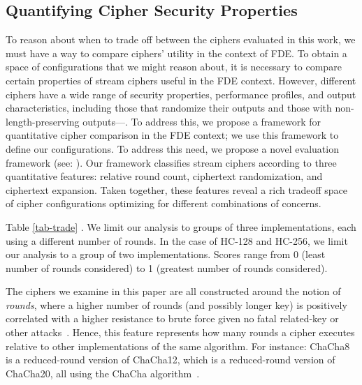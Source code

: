 \subsection{Quantifying Cipher Security Properties}\label{subsec:quantify}

To reason about when to trade off between the ciphers evaluated in this work, we
must have a way to compare ciphers' utility in the context of \sys FDE. To
obtain a space of configurations that we might reason about, it is necessary to
compare certain properties of stream ciphers useful in the FDE context. However,
different ciphers have a wide range of security properties, performance
profiles, and output characteristics, including those that randomize their
outputs and those with non-length-preserving outputs---. To address this, we propose a framework for
quantitative cipher comparison in the FDE context; we use this framework to
define our configurations.  To
address this need, we propose a novel evaluation framework (see:
). Our framework classifies stream ciphers according to
three quantitative features: relative round count, ciphertext randomization, and
ciphertext expansion. Taken together, these features reveal a rich tradeoff
space of cipher configurations optimizing for different combinations of
concerns.

Table \ref{tab-trade} . We limit our analysis to groups of
three implementations, each using a different number of rounds. In the case of
HC-128 and HC-256, we limit our analysis to a group of two implementations.
Scores range from 0 (least number of rounds considered) to 1 (greatest number of
rounds considered).




 The ciphers we examine in this paper are all
constructed around the notion of \emph{rounds}, where a higher number of rounds
(and possibly longer key) is positively correlated with a higher resistance to
brute force given no fatal related-key or other
attacks~\cite{ChaCha-Cryptanalysis}. Hence, this feature represents how many
rounds a cipher executes relative to other implementations of the same
algorithm. For instance: ChaCha8 is a reduced-round version of ChaCha12, which
is a reduced-round version of ChaCha20, all using the ChaCha
algorithm~\cite{ChaCha20,ChaCha-Cryptanalysis}.

